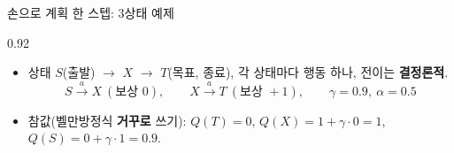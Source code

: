 \begin{frame}{손으로 계획 한 스텝: 3상태 예제}
\begin{center}\begin{varwidth}{0.92\textwidth}
  \begin{itemize}
    \item 상태 $S$(출발) $\to$ $X$ $\to$ $T$(목표, 종료),
      각 상태마다 행동 하나, 전이는 \textbf{결정론적}.
    \[
    S \xrightarrow{a} X \ (\text{보상 } 0), \qquad
    X \xrightarrow{a} T \ (\text{보상 } +1), \qquad
    \gamma = 0.9, \ \alpha = 0.5
    \]
    \item 참값(벨만방정식 \textbf{거꾸로} 쓰기):
      $Q(T)=0$, $Q(X) = 1 + \gamma\cdot 0 = 1$,
      $Q(S) = 0 + \gamma\cdot 1 = 0.9$.
    
  \end{itemize}
\end{varwidth}\end{center}
\end{frame}
